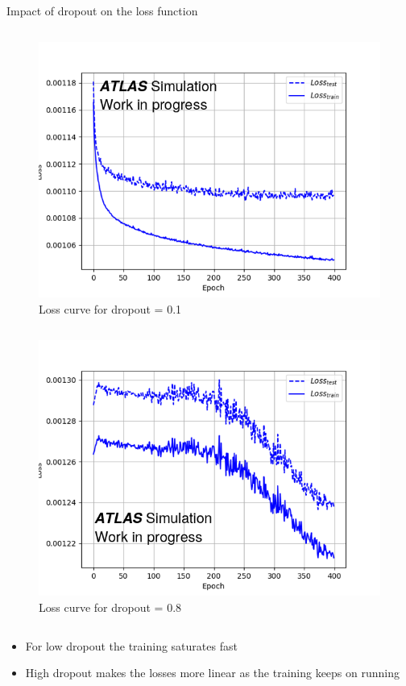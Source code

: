 \documentclass[12pt]{beamer}
\begin{document}
\begin{frame}{Impact of dropout on the loss function}
\vspace{-1.2cm}
\begin{column}{0.5\textwidth}
    \begin{figure}
        \centering
        \includegraphics[width=1.1\textwidth]{dropout01.png}
        \caption{Loss curve for dropout = 0.1}
        \label{fig:my_label}
    \end{figure}
\end{column}
\begin{column}{0.5\textwidth}
    \begin{figure}
        \centering
        \includegraphics[width=1.1\textwidth]{dropout08.png}
        \caption{Loss curve for dropout = 0.8}
        \label{fig:my_label}
    \end{figure}
\end{column}
\begin{itemize}
    \item For low dropout the training saturates fast
    \item High dropout makes the losses more linear as the training keeps on running
\end{itemize}
\end{frame}
\end{document}
